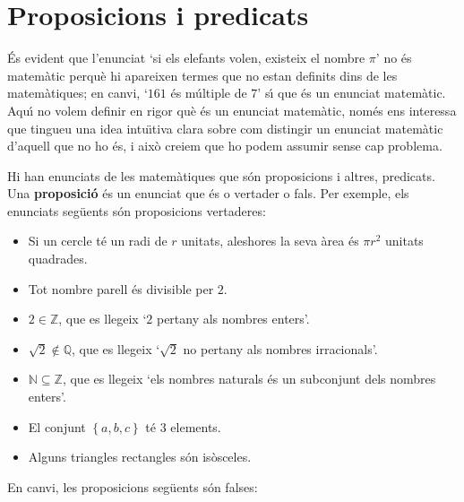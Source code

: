 \section{Proposicions i predicats{}}

\'{E}s evident que l'enunciat `si els elefants volen, existeix el nombre $%
\pi $' no \'{e}s matem\`{a}tic perqu\`{e} hi apareixen termes que no estan
definits dins de les matem\`{a}tiques; en canvi, `$161$ \'{e}s m\'{u}ltiple
de $7$' s\'{\i} que \'{e}s un enunciat matem\`{a}tic. Aqu\'{\i} no volem
definir en rigor qu\`{e} \'{e}s un enunciat matem\`{a}tic, nom\'{e}s ens
interessa que tingueu una idea intu\"{\i}tiva clara sobre com distingir un
enunciat matem\`{a}tic d'aquell que no ho \'{e}s, i aix\`{o} creiem que ho
podem assumir sense cap problema.

Hi han enunciats de les matem\`{a}tiques que s\'{o}n proposicions i altres,
predicats. Una \textbf{proposici\'{o}} \'{e}s un enunciat que \'{e}s o
vertader o fals. Per exemple, els enunciats seg\"{u}ents s\'{o}n
proposicions vertaderes:

\begin{itemize}
\item Si un cercle t\'{e} un radi de $r$ unitats, aleshores la seva \`{a}rea
\'{e}s $\pi r^{2}$ unitats quadrades.

\item Tot nombre parell \'{e}s divisible per $2$.

\item $2\in\mathbb{Z}$, que es llegeix `$2$ pertany als nombres enters'.

\item $\sqrt{2}\notin\mathbb{Q}$, que es llegeix `$\sqrt{2}$ no pertany als
nombres irracionals'.

\item $\mathbb{N}\subseteq\mathbb{Z}$, que es llegeix `els nombres naturals
\'{e}s un subconjunt dels nombres enters'.

\item El conjunt $\left\{ a,b,c\right\} $ t\'{e} 3 elements.

\item Alguns triangles rectangles s\'{o}n is\`{o}sceles.
\end{itemize}

En canvi, les proposicions seg\"{u}ents s\'{o}n falses:

